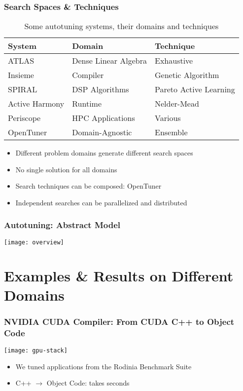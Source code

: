 \documentclass[10pt, compress, aspectratio=169, xcolor=table]{beamer}
\begin{document}
\begin{frame}
    \frametitle{Search Spaces \& Techniques}
    \begin{table}[]
        \centering
        \begin{tabular}{@{}lll@{}}
            \toprule
            System & Domain & Technique \\ \midrule
            ATLAS & Dense Linear Algebra & Exhaustive \\
            Insieme & Compiler & Genetic Algorithm \\
            SPIRAL & DSP Algorithms & Pareto Active Learning \\
            Active Harmony & Runtime & Nelder-Mead \\
            Periscope & HPC Applications & Various \\
            \alert{OpenTuner} & \alert{Domain-Agnostic} & \alert{Ensemble} \\ \bottomrule
        \end{tabular}
        \caption{Some autotuning systems, their domains and techniques}
    \end{table}

    \pause

    \begin{itemize}
        \item Different \alert{problem domains} generate different \alert{search spaces}
        \item \alert{No single solution} for all domains
        \item Search techniques can be composed: \alert{OpenTuner}
        \item Independent searches can be \alert{parallelized and distributed}
    \end{itemize}
\end{frame}

\begin{frame}
    \frametitle{Autotuning: Abstract Model}
    \begin{center}
        \texttt{[image: overview]}
    \end{center}
\end{frame}

\section{Examples \& Results on Different Domains}

\begin{frame}
    \frametitle{NVIDIA CUDA Compiler: From CUDA C++ to Object Code}
    \begin{center}
        \texttt{[image: gpu-stack]}
    \end{center}

    \begin{itemize}
        \item We tuned applications from the \alert{Rodinia Benchmark Suite}
        \item C++ $\rightarrow$ Object Code: takes \alert{seconds}
    \end{itemize}
\end{frame}
\end{document}
